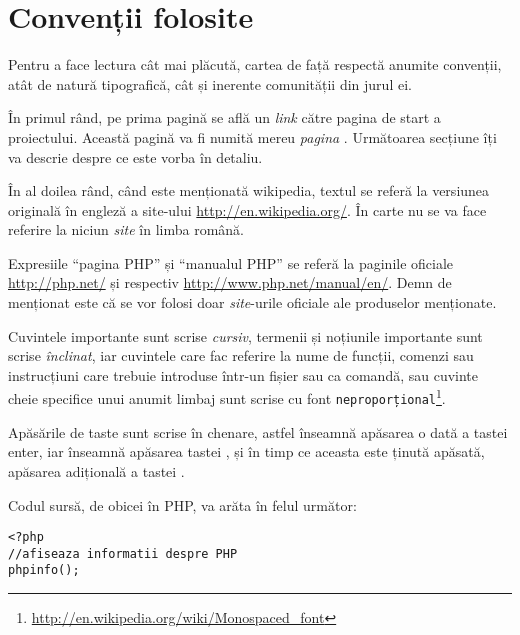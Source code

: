 \section*{Convenții folosite}
{}

Pentru a face lectura cât mai plăcută, cartea de față respectă anumite
convenții, atât de natură tipografică, cât și inerente comunității din jurul
ei.

În primul rând, pe prima pagină se află un \textsl{link} către pagina de
start a proiectului. Această pagină va fi numită mereu \textit{pagina \phpro}.
Următoarea secțiune îți va descrie despre ce este vorba în detaliu.

În al doilea rând, când este menționată wikipedia, textul se referă la
versiunea originală în engleză a site-ului \url{http://en.wikipedia.org/}. În
carte nu se va face referire la niciun \textsl{site} în limba română.

Expresiile ``pagina PHP'' și ``manualul PHP'' se referă la paginile oficiale
\url{http://php.net/} și respectiv \url{http://www.php.net/manual/en/}. Demn de
menționat este că se vor folosi doar \textit{site}-urile oficiale ale
produselor menționate.


Cuvintele importante sunt scrise \textit{cursiv}, termenii și noțiunile
importante sunt scrise \textsl{înclinat}, iar cuvintele care fac referire la
nume de funcții, comenzi sau instrucțiuni care trebuie introduse într-un fișier
sau ca comandă, sau cuvinte cheie specifice unui anumit limbaj sunt scrise cu
font
\texttt{neproporțional}\footnote{\url{http://en.wikipedia.org/wiki/Monospaced_font}}.

Apăsările de taste sunt scrise în chenare, astfel  înseamnă
apăsarea o dată a tastei enter, iar  înseamnă apăsarea tastei
, și în timp ce aceasta este ținută apăsată, apăsarea
adițională a tastei .

Codul sursă, de obicei în PHP, va arăta în felul următor:

\begin{lstlisting}[caption={Convenție listare}]
<?php
//afiseaza informatii despre PHP
phpinfo();
\end{lstlisting}

